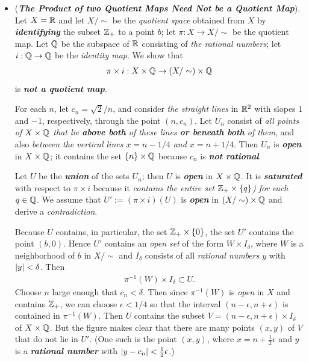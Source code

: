 \documentclass[11pt]{article}
\begin{document}
\begin{itemize}
\item \begin{example}(\emph{\textbf{The Product of two Quotient Maps Need Not be a Quotient Map}}).\\
Let $X = {\mathbb R}$ and let $X/\sim$ be the \emph{quotient space} obtained from $X$ by \emph{\textbf{identifying}} the subset ${\mathbb Z}_{+}$ to a point $b$; let $\pi : X \rightarrow X/\sim$ be the quotient map. Let ${\mathbb Q}$ be the subspace of ${\mathbb R}$ consisting of \emph{the rational numbers}; let $i : {\mathbb Q} \rightarrow {\mathbb Q}$ be the \emph{identity map}. We show that
\begin{align*}
\pi \times i: X \times {\mathbb Q} \rightarrow (X/\sim) \times {\mathbb Q}
\end{align*}
is \emph{\textbf{not a quotient map}}.

For each $n$, let $c_n = \sqrt{2}/n$, and consider \emph{the straight lines} in ${\mathbb R}^2$ with slopes $1$ and $-1$, respectively, through the point $(n, c_n)$. Let $U_n$ consist of \emph{all points of $X \times {\mathbb Q}$ that lie \textbf{above both} of these lines \textbf{or beneath both} of them}, and also \emph{between the vertical lines $x = n - 1/4$ and $x = n + 1/4$}. Then $U_{n}$ is \emph{\textbf{open}} in $X \times {\mathbb Q}$; it contains the set $\{n\} \times {\mathbb Q}$ because $c_{n}$ is \emph{\textbf{not rational}}. 

Let $U$ be the \emph{\textbf{union}} of the sets $U_n$; then $U$ is \emph{\textbf{open}} in $X \times {\mathbb Q}$. It is \emph{\textbf{saturated}} with respect
to $\pi \times i$ because it \emph{contains the entire set ${\mathbb Z}_{+} \times \left\{q\right\}$) for each $q \in {\mathbb Q}$}. We assume that $U' := (\pi \times i)(U)$ is \emph{\textbf{open}} in $(X/\sim) \times {\mathbb Q}$ and derive a \emph{contradiction}.

Because $U$ contains, in particular, the set  ${\mathbb Z}_{+} \times \left\{0\right\}$, the set $U'$ contains the point $(b, 0)$. Hence $U'$ contains an \emph{open set} of the form $W \times I_{\delta}$, where $W$ is a neighborhood of $b$ in $X/\sim$ and $I_{\delta}$ consists of all \emph{rational numbers} $y$ with $\left\lvert y \right\rvert < \delta$. Then
\begin{align*}
\pi^{-1}(W) \times I_{\delta} \subset U.
\end{align*}
Choose $n$ large enough that $c_n < \delta$. Then since $\pi^{-1}(W)$ is \emph{open} in $X$ and contains ${\mathbb Z}_{+}$, we can choose $\epsilon < 1/4$ so that the interval $(n - \epsilon, n + \epsilon)$ is contained in $\pi^{-1}(W)$. Then $U$ contains the subset $V =(n - \epsilon, n + \epsilon) \times  I_{\delta}$ of $X \times {\mathbb Q}$. But the figure makes clear that there are many points $(x, y)$ of $V$ that do not lie in $U'$. (One such is the point $(x, y)$, where $x = n + \frac{1}{2}\epsilon$ and $y$ is a \textbf{\emph{rational number}} with $\left\lvert y - c_{n} \right\rvert < \frac{1}{2}\epsilon$.)


\end{example}
\end{itemize}
\end{document}
